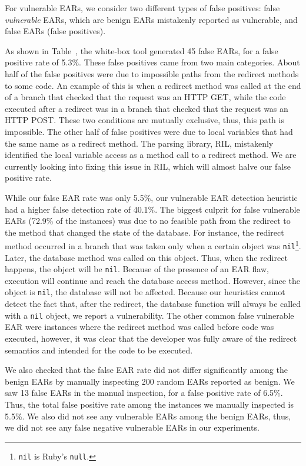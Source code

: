 For vulnerable EARs, we consider two different types
of false positives: false \emph{vulnerable} EARs, which are benign EARs
mistakenly reported as vulnerable, and false EARs (false positives).

As shown in Table~, the white-box tool
generated 45 false EARs, for a false positive rate of 5.3\%. These
false positives came from two main categories. About half of the false
positives were due to  impossible paths from the redirect methods to
some code. An example of this is when a redirect method was called at
the end of a branch that checked that the request was an HTTP GET,
while the code executed after a redirect was in a branch that checked
that the request was an HTTP POST. These two conditions are mutually
exclusive, thus, this path is impossible. The other half of false
positives were due to local variables that had the same name as a
redirect method. The parsing library, RIL, mistakenly identified the
local variable access as a method call to a redirect method. We are
currently looking into fixing this issue in RIL, which will almost
halve our false positive rate.

While our false EAR rate was only 5.5\%, our vulnerable EAR detection
heuristic had a higher false detection rate of 40.1\%. The biggest culprit
for false vulnerable EARs (72.9\% of the instances) was due to no feasible
path from the redirect to the method that changed the state of the
database. For instance, the redirect method occurred in a branch that was
taken only when a certain object was \texttt{nil}\footnote{\texttt{nil} is
  Ruby's \texttt{null}.}. Later, the database method was called on this
object. Thus, when the redirect happens, the object will be \texttt{nil}.
Because of the presence of an EAR flaw, execution will continue and reach
the database access method. However, since the object is \texttt{nil}, the
database will not be affected. Because our heuristics cannot detect the
fact that, after the redirect, the database function will always be called
with a \texttt{nil} object, we report a vulnerability. The other common
false vulnerable EAR were instances where the redirect method was called
before code was executed, however, it was clear that the developer was
fully aware of the redirect semantics and intended for the code to be
executed.

We also checked that the false EAR rate did not differ significantly among
the benign EARs by manually inspecting 200 random EARs reported as benign.
We saw 13 false EARs in the manual inspection, for a false positive rate of
6.5\%. Thus, the total false positive rate among the instances we manually
inspected is 5.5\%. We also did not see any vulnerable EARs among the
benign EARs, thus, we did not see any false negative vulnerable EARs in our
experiments.

